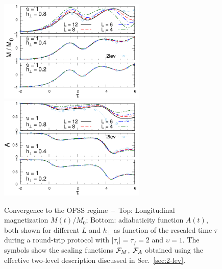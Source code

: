\begin{figure}[t]
\centering
\includegraphics[width=7cm]{imm/fssconvM.pdf}
\includegraphics[width=7cm]{imm/fssconvA.pdf}
\caption{Convergence to the OFSS regime~--~Top: Longitudinal magnetization $M(t)/M_0$; Bottom: adiabaticity function $A(t)$, both shown for different $L$ and $h_\perp$ as function of the rescaled time $\tau$ during a round-trip protocol with $|\tau_i|=\tau_f=2$ and $\upsilon=1$. The symbols show the scaling functions ${\cal F}_M$, ${\cal F}_A$ obtained using the effective two-level description discussed in Sec.~\ref{sec:2-lev}.} 
\label{fig:convergence}
\end{figure}

